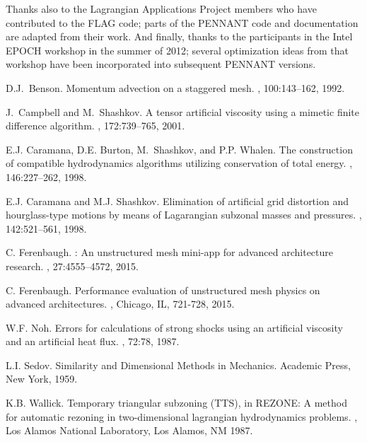 \documentclass[11pt,letterpaper]{article}
\begin{document}
Thanks also to the Lagrangian Applications Project members who have
contributed to the FLAG code; parts of the PENNANT code and documentation
are adapted from their work.
And finally, thanks to the participants in the Intel EPOCH workshop
in the summer of 2012; several optimization ideas from that workshop
have been incorporated into subsequent PENNANT versions.


\begin{thebibliography}{9}


D.J.~Benson.
\newblock Momentum advection on a staggered mesh.
, 100:143--162, 1992.

J.~Campbell and M.~Shashkov.
\newblock A tensor artificial viscosity using a mimetic finite difference
  algorithm.
, 172:739--765, 2001.

E.J. Caramana, D.E. Burton, M.~Shashkov, and P.P. Whalen.
\newblock The construction of compatible hydrodynamics algorithms utilizing
  conservation of total energy.
, 146:227--262, 1998.

E.J. Caramana and M.J. Shashkov.
\newblock Elimination of artificial grid distortion and hourglass-type motions
  by means of {L}agarangian subzonal masses and pressures.
, 142:521--561, 1998.

C. Ferenbaugh.
: An unstructured mesh mini-app for advanced
  architecture research.
, 27:4555--4572, 2015.

C. Ferenbaugh.  
\newblock Performance evaluation of unstructured mesh physics on
  advanced architectures.
, Chicago, IL, 721-728, 2015.

W.F. Noh.
\newblock Errors for calculations of strong shocks using an artificial viscosity and an artificial heat flux.
, 72:78, 1987.

L.I. Sedov.
\newblock Similarity and Dimensional Methods in Mechanics.
\newblock Academic Press, New York, 1959.

K.B. Wallick.
\newblock Temporary triangular subzoning ({TTS}), in {REZONE}: A method for
  automatic rezoning in two-dimensional lagrangian hydrodynamics problems.
, Los Alamos National Laboratory, Los
  Alamos, NM 1987.

\end{thebibliography}
\end{document}
